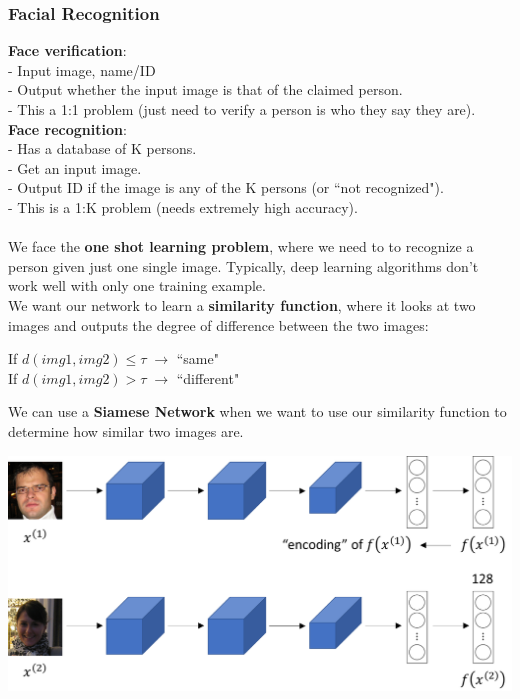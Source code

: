 \documentclass[11pt, a4paper]{article}
\begin{document}
\begin{spacing}{1.1}
	\subsubsection{Facial Recognition}
	\textbf{Face verification}: \\
	- Input image, name/ID \\
	- Output whether the input image is that of the claimed person. \\
	- This a 1:1 problem (just need to verify a person is who they say they are). \vspace*{1mm}\\
	\textbf{Face recognition}: \\
	- Has a database of K persons.\\
	- Get an input image. \\
	- Output ID if the image is any of the K persons (or ``not recognized").\\
	- This is a 1:K problem (needs extremely high accuracy). \\~\\	
	We face the \textbf{one shot learning problem}, where we need to to recognize a person given just one single image. Typically, deep learning algorithms don't work well with only one training example. \vspace*{2mm}\\
	We want our network to learn a \textbf{similarity function}, where it looks at two images and outputs the degree of difference between the two images:
	\begin{center}
	If $d(img1,img2) \leq \tau\; \rightarrow$ ``same" \\
	If $d(img1,img2) > \tau\; \rightarrow$ ``different"
	\end{center} \vspace*{1.5mm}
	We can use a \textbf{Siamese Network} when we want to use our similarity function to determine how similar two images are.
	\begin{center}
	\includegraphics[scale=.5]{siamese}

\end{center}
\end{spacing}
\end{document}
